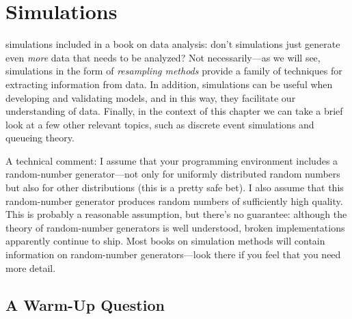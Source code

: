 

\chapter{Simulations}{}{}
\label{ch:simulation}

  

 simulations included in a book on data
analysis: don't simulations just generate even \emph{more} data that
needs to be analyzed? Not necessarily---as we will see, simulations in
the form of \emph{resampling methods} provide a family of techniques
for extracting information from data. In addition, simulations can be
useful when developing and validating models, and in this way, they
facilitate our understanding of data. Finally, in the context of this
chapter we can take a brief look at a few other relevant topics, such
as discrete event simulations and queueing theory.

A technical comment: I assume that your programming environment
includes a random-number generator---not only for uniformly
distributed random numbers but also for other distributions (this is a
pretty safe bet). I also assume that this random-number generator
produces random numbers of sufficiently high quality. This is probably
a reasonable assumption, but there's no guarantee: although the theory
of random-number generators is well understood, broken implementations
apparently continue to ship. Most books on simulation methods will
contain information on random-number generators---look there if you
feel that you need more detail.

\section{A Warm-Up Question}


